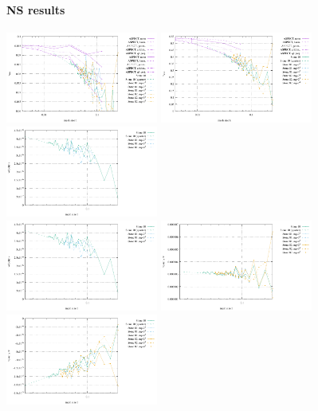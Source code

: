 \paragraph{NS results}

\begin{center}
\includegraphics[width=5cm]{images/stokes_sphere3D/vrms_NS}
\includegraphics[width=5cm]{images/stokes_sphere3D/max_vel_NS}
\includegraphics[width=5cm]{images/stokes_sphere3D/max_u_NS}\\
\includegraphics[width=5cm]{images/stokes_sphere3D/max_v_NS}
\includegraphics[width=5cm]{images/stokes_sphere3D/max_w_NS}
\includegraphics[width=5cm]{images/stokes_sphere3D/min_w_NS}\\

\end{center}
